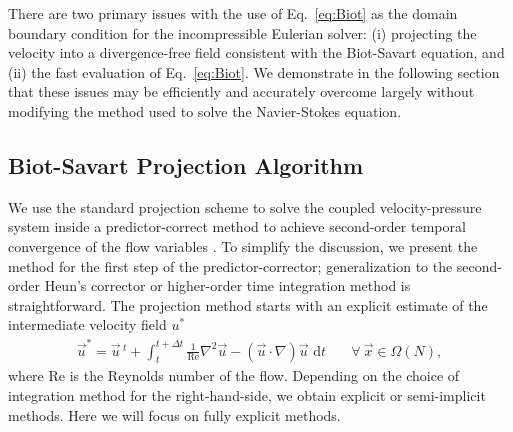 \documentclass[final,1p,times]{elsarticle}
\begin{document}
There are two primary issues with the use of Eq.~\ref{eq:Biot} as the domain boundary condition for the incompressible Eulerian solver: (i) projecting the velocity into a divergence-free field consistent with the Biot-Savart equation, and (ii) the fast evaluation of Eq.~\ref{eq:Biot}. We demonstrate in the following section that these issues may be efficiently and accurately overcome largely without modifying the method used to solve the Navier-Stokes equation.

\subsection{Biot-Savart Projection Algorithm}\label{sec:Biot_projection}

We use the standard projection scheme \cite{Chorin1967} to solve the coupled velocity-pressure system inside a predictor-correct method to achieve second-order temporal convergence of the flow variables \cite{Lauber2022}. 
To simplify the discussion, we present the method for the first step of the predictor-corrector; generalization to the second-order Heun's corrector or higher-order time integration method is straightforward. The projection method starts with an explicit estimate of the intermediate velocity field $u^*$
\begin{align}\label{eq:intermediate}
    \vec{u}^* = \vec{u}\,^t + \int_{t}^{t+\Delta t}\frac{1}{\text{Re}}\nabla^2\vec{u} -\left(\vec{u}\cdot\nabla\right)\vec{u}\text{ d}t &\quad\forall\ \vec{x}\in\Omega (N),
\end{align}
where $\text{Re}$ is the Reynolds number of the flow. Depending on the choice of integration method for the right-hand-side, we obtain explicit or semi-implicit methods. Here we will focus on fully explicit methods. 


\end{document}
